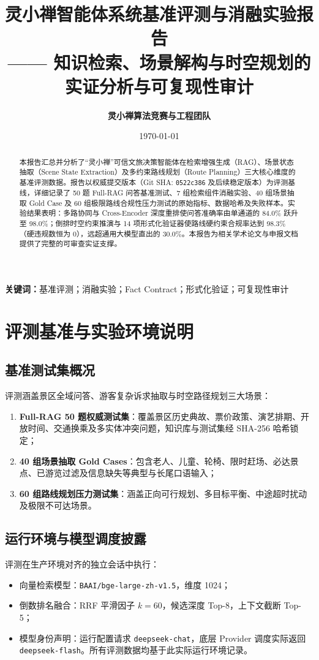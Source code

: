 \documentclass[11pt,a4paper]{ctexart}
\title{\LARGE\bfseries 灵小禅智能体系统基准评测与消融实验报告\\
\large —— 知识检索、场景解构与时空规划的实证分析与可复现性审计}
\author{\bfseries 灵小禅算法竞赛与工程团队}
\date{\today}
\begin{document}
\maketitle

\begin{abstract}
本报告汇总并分析了“灵小禅”可信文旅决策智能体在检索增强生成（RAG）、场景状态抽取（Scene State Extraction）及多约束路线规划（Route Planning）三大核心维度的基准评测数据。报告以权威提交版本（Git SHA: \texttt{0522c386} 及后续稳定版本）为评测基线，详细记录了 50 题 Full-RAG 问答基准测试、7 组检索组件消融实验、40 组场景抽取 Gold Case 及 60 组极限路线合规性压力测试的原始指标、数据哈希及失败样本。实验结果表明：多路协同与 Cross-Encoder 深度重排使问答准确率由单通道的 84.0\% 跃升至 98.0\%；倒排时空约束推演与 14 项形式化验证器使路线硬约束合规率达到 98.3\%（硬违规数恒为 0），远超通用大模型直出的 30.0\%。本报告为相关学术论文与申报文档提供了完整的可审查实证支撑。
\end{abstract}

\vspace{0.8em}
\noindent\textbf{关键词：}基准评测；消融实验；Fact Contract；形式化验证；可复现性审计

\vspace{1.5em}

\section{评测基准与实验环境说明}

\subsection{基准测试集概况}
评测涵盖景区全域问答、游客复杂诉求抽取与时空路径规划三大场景：
\begin{enumerate}
    \item \textbf{Full-RAG 50 题权威测试集}：覆盖景区历史典故、票价政策、演艺排期、开放时间、交通换乘及多实体冲突问题，知识库与测试集经 SHA-256 哈希锁定；
    \item \textbf{40 组场景抽取 Gold Cases}：包含老人、儿童、轮椅、限时赶场、必达景点、已游览过滤及信息缺失等典型与长尾口语输入；
    \item \textbf{60 组路线规划压力测试集}：涵盖正向可行规划、多目标平衡、中途超时扰动及极限不可达场景。
\end{enumerate}

\subsection{运行环境与模型调度披露}
评测在生产环境对齐的独立会话中执行：
\begin{itemize}
    \item 向量检索模型：\texttt{BAAI/bge-large-zh-v1.5}，维度 1024；
    \item 倒数排名融合：RRF 平滑因子 $k = 60$，候选深度 Top-8，上下文截断 Top-5；
    \item 模型身份声明：运行配置请求 \texttt{deepseek-chat}，底层 Provider 调度实际返回 \texttt{deepseek-flash}。所有评测数据均基于此实际运行环境记录。
\end{itemize}
\end{document}
